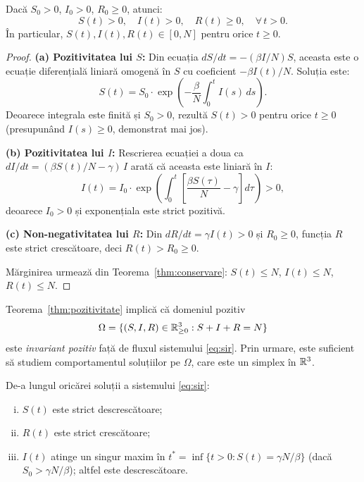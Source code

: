 \begin{teorema}
\label{thm:pozitivitate}
Dacă $S_0 > 0$, $I_0 > 0$, $R_0 \geq 0$, atunci:
\begin{equation}
    S(t) > 0, \quad I(t) > 0, \quad R(t) \geq 0, \quad \forall\, t > 0.
\end{equation}
În particular, $S(t), I(t), R(t) \in [0, N]$ pentru orice $t \geq 0$.
\end{teorema}

\begin{proof}
\textbf{(a) Pozitivitatea lui $S$:} Din ecuația $dS/dt = -(\beta I/N) S$,
aceasta este o ecuație diferențială liniară omogenă în $S$ cu
coeficient $-\beta I(t)/N$. Soluția este:
\begin{equation}
\label{eq:S_formula}
    S(t) = S_0 \cdot \exp\!\left(-\frac{\beta}{N}\int_0^t I(s)\,ds\right).
\end{equation}
Deoarece integrala este finită și $S_0 > 0$, rezultă $S(t) > 0$ pentru orice $t \geq 0$
(presupunând $I(s) \geq 0$, demonstrat mai jos).

\textbf{(b) Pozitivitatea lui $I$:} Rescrierea ecuației a doua ca
$dI/dt = (\beta S(t)/N - \gamma)\, I$ arată că aceasta este liniară în $I$:
\begin{equation}
    I(t) = I_0 \cdot \exp\!\left(\int_0^t \left[\frac{\beta S(\tau)}{N} - \gamma\right]d\tau\right) > 0,
\end{equation}
deoarece $I_0 > 0$ și exponențiala este strict pozitivă.

\textbf{(c) Non-negativitatea lui $R$:} Din $dR/dt = \gamma I(t) > 0$ și $R_0 \geq 0$,
funcția $R$ este strict crescătoare, deci $R(t) > R_0 \geq 0$.

Mărginirea urmează din Teorema~\ref{thm:conservare}: $S(t) \leq N$, $I(t) \leq N$,
$R(t) \leq N$.
\end{proof}

\begin{observatie}
Teorema~\ref{thm:pozitivitate} implică că domeniul pozitiv
\begin{equation}
    \Omega = \{(S, I, R) \in \mathbb{R}^3_{\geq 0} : S + I + R = N\}
\end{equation}
este \emph{invariant pozitiv} față de fluxul sistemului \eqref{eq:sir}. Prin urmare,
este suficient să studiem comportamentul soluțiilor pe $\Omega$, care este un simplex
în $\mathbb{R}^3$.
\end{observatie}

\begin{teorema}
\label{thm:monotonie}
De-a lungul oricărei soluții a sistemului \eqref{eq:sir}:
\begin{enumerate}[(i)]
    \item $S(t)$ este strict descrescătoare;
    \item $R(t)$ este strict crescătoare;
    \item $I(t)$ atinge un singur maxim în $t^* = \inf\{t > 0 : S(t) = \gamma N/\beta\}$
    (dacă $S_0 > \gamma N/\beta$); altfel este descrescătoare.
\end{enumerate}
\end{teorema}

